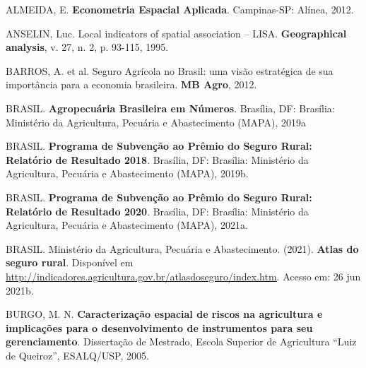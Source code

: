 \documentclass[
	12pt,				%
	openright,			%
	oneside,			%
	a4paper,			%
	chapter=TITLE,		%
	section=TITLE,		%
	english,			%
	french,				%
	spanish,			%
	brazil				%
	]{abntex2}
\begin{document}
\newpage
	
\providecommand{\abntreprintinfo}[1]{%
 \citeonline{#1}}
\setlength{\labelsep}{0pt}\begin{thebibliography}{}
\providecommand{\abntrefinfo}[3]{}
\providecommand{\abntbstabout}[1]{}
\abntbstabout{v-1.9.6}

    \abntrefinfo{almeida12}{ALMEIDA}{2012}
    {ALMEIDA, E. \textbf{Econometria Espacial Aplicada}. Campinas-SP: Alínea, 2012.}
    
    \abntrefinfo{anselin95}{ANSELIN}{1995}
    {ANSELIN, Luc. Local indicators of spatial association -- LISA. \textbf{Geographical analysis}, v. 27, n. 2, p. 93-115, 1995.}
    
    \abntrefinfo{barros12}{BARROS \textit{et al}}{2012}
    {BARROS, A. et al. Seguro Agrícola no Brasil: uma visão estratégica de sua importância para a economia brasileira. \textbf{MB Agro}, 2012.}
    
    \abntrefinfo{brasil19}{BRASIL}{2019a}
    {BRASIL. \textbf{Agropecuária Brasileira em Números}. Brasília, DF: Brasília: Ministério da Agricultura, Pecuária e Abastecimento (MAPA), 2019a }
    
    \abntrefinfo{brasil19b}{BRASIL}{2019b}
    {BRASIL. \textbf{Programa de Subvenção ao Prêmio do Seguro Rural: Relatório de Resultado 2018}. Brasília, DF: Brasília: Ministério da Agricultura, Pecuária e Abastecimento (MAPA), 2019b.}
    
    \abntrefinfo{brasil21}{BRASIL}{2021a}
    {BRASIL. \textbf{Programa de Subvenção ao Prêmio do Seguro Rural: Relatório de Resultado 2020}. Brasília, DF: Brasília: Ministério da Agricultura, Pecuária e Abastecimento (MAPA), 2021a.}
    
    \abntrefinfo{brasil21}{MAPA}{2021b}
    {BRASIL.  Ministério  da  Agricultura,  Pecuária  e  Abastecimento.  (2021).  \textbf{Atlas  do  seguro  rural}. Disponível em \url{http://indicadores.agricultura.gov.br/atlasdoseguro/index.htm}. Acesso em: 26 jun 2021b.}
    
    \abntrefinfo{burgo05}{BURGO}{2005}
    BURGO, M. N. \textbf{Caracterização espacial de riscos na agricultura e implicações para o desenvolvimento de instrumentos para seu gerenciamento}. Dissertação de Mestrado, Escola Superior de Agricultura “Luiz de Queiroz”, ESALQ/USP, 2005.
    

\end{thebibliography}
\end{document}
